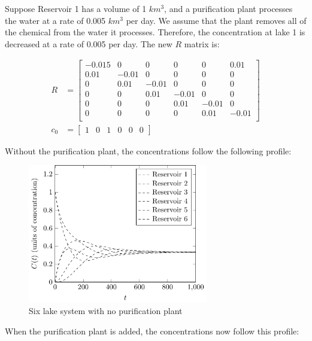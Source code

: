 \documentclass{article}
\begin{document}
Suppose Reservoir 1 has a volume of 1 $km^3$, and a purification plant processes
	the water at a rate of 0.005 $km^3$ per day.
We assume that the plant removes all of the chemical from the water it processes.
Therefore, the concentration at lake 1 is decreased at a rate of 0.005 per day.
The new $R$ matrix is:

\begin{align}
R & = \left[ \begin{matrix}
-0.015 & 0 & 0 & 0 & 0 & 0.01 \\
0.01 & -0.01 & 0 & 0 & 0 & 0 \\
0 & 0.01 & -0.01 & 0 & 0 & 0 \\
0 & 0 & 0.01 & -0.01 & 0 & 0 \\
0 & 0 & 0 & 0.01 & -0.01 & 0 \\
0 & 0 & 0 & 0 & 0.01 & -0.01 \\
\end{matrix} \right] \label{eq:R-1.2} \\
c_0 & = \left[ \begin{matrix} 1 & 0 & 1 & 0 & 0 & 0 \end{matrix} \right]
	\label{eq:c_0-1.2}
\end{align}

Without the purification plant, the concentrations follow the following profile:

\begin{figure}[h!]
\includegraphics[width=0.7\textwidth]{figures/six-lakes-no-purification.pdf}
\caption{Six lake system with no purification plant}
\label{fig:six-lakes-no-purification}
\end{figure}

When the purification plant is added, the concentrations now follow this profile:
\end{document}
